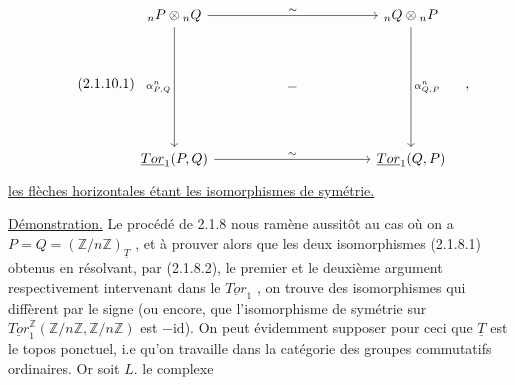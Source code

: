 \begin{equation}\tag{2.1.10.1}
\begin{tikzcd}[column sep=huge, row sep=huge]
{}_nP \otimes {}_nQ \arrow[rr, "\sim"] \arrow[dd, "{\alpha^n_{P,Q}}"'] & & {}_nQ \otimes {}_nP \arrow[dd, "{\alpha^n_{Q,P}}"] \\
 & - & \\
\underline{Tor}_1(P,Q) \arrow[rr, "\sim"] & & \underline{Tor}_1(Q,P)
\end{tikzcd}\quad ,
\end{equation}
\underline{les flèches horizontales étant les isomorphismes de symétrie.}



\underline{Démonstration.} Le procédé de 2.1.8 nous ramène aussitôt au cas où on a $P=Q = (\mathbb{Z}/n\mathbb{Z})_{\underline{T}}$ , et à prouver alors que les deux isomorphismes (2.1.8.1) obtenus en résolvant, par (2.1.8.2), le premier et le deuxième argument respectivement intervenant dans le $\underline{Tor}_1$ , on trouve des isomorphismes qui diffèrent par le signe (ou encore, que l'isomorphisme de symétrie sur $\underline{Tor}_1^{\mathbb{Z}}(\mathbb{Z}/n\mathbb{Z} , \mathbb{Z}/n\mathbb{Z})$ est $-\mathrm{id}$). On peut évidemment supposer pour ceci que $\underline{T}$ est le topos ponctuel, i.e qu'on travaille dans la catégorie des groupes commutatifs ordinaires. Or soit $L.$ le complexe

